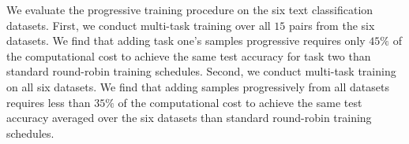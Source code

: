 We evaluate the progressive training procedure on the six text classification datasets.
First, we conduct multi-task training over all $15$ pairs from the six datasets.
We find that adding task one's samples progressive requires only $45\%$ of the computational cost to achieve the same test accuracy for task two than standard round-robin training schedules.
Second, we conduct multi-task training on all six datasets.
We find that adding samples progressively from all datasets requires less than $35\%$ of the computational cost to achieve the same test accuracy averaged over the six datasets than standard round-robin training schedules.





